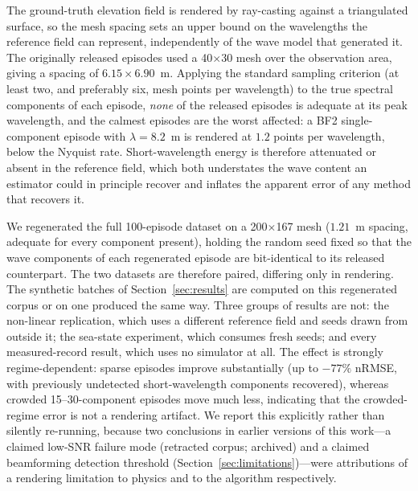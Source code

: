 \documentclass[review]{elsarticle}
\begin{document}
The ground-truth elevation field is rendered by ray-casting against a
triangulated surface, so the mesh spacing sets an upper bound on the
wavelengths the reference field can represent, independently of the
wave model that generated it.  The originally released episodes used a
40$\times$30 mesh over the observation area, giving a spacing of
$6.15 \times 6.90$~m.  Applying the standard sampling criterion
(at least two, and preferably six, mesh points per wavelength) to the
true spectral components of each episode, \emph{none} of the released
episodes is adequate at its peak wavelength, and the calmest episodes
are the worst affected: a BF2 single-component episode with
$\lambda = 8.2$~m is rendered at $1.2$ points per wavelength, below
the Nyquist rate.  Short-wavelength energy is therefore attenuated or
absent in the reference field, which both understates the wave content
an estimator could in principle recover and inflates the apparent error
of any method that recovers it.

We regenerated the full 100-episode dataset on a 200$\times$167 mesh
($1.21$~m spacing, adequate for every component present), holding the
random seed fixed so that the wave components of each regenerated
episode are bit-identical to its released counterpart.  The two
datasets are therefore paired, differing only in rendering.
The synthetic batches of Section~\ref{sec:results} are computed on this regenerated
corpus or on one produced the same way. Three groups of results are not: the
non-linear replication, which uses a different reference field and seeds drawn from
outside it; the sea-state experiment, which consumes fresh seeds; and every
measured-record result, which uses no simulator at all.  The effect is strongly regime-dependent: sparse episodes
improve substantially (up to $-77\%$ nRMSE, with previously undetected
short-wavelength components recovered), whereas crowded
15--30-component episodes move much less, indicating that the
crowded-regime error is not a rendering artifact.  We report this
explicitly rather than silently re-running, because two conclusions in
earlier versions of this work---a claimed low-SNR failure mode
(retracted corpus; archived) and a claimed beamforming detection
threshold (Section~\ref{sec:limitations})---were attributions of a
rendering limitation to physics and to the algorithm respectively.
\end{document}
